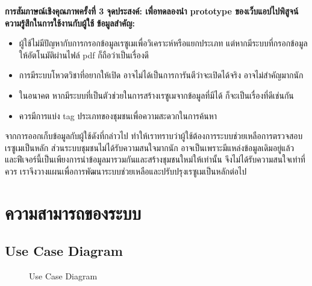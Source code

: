 \noindent\textbf{การสัมภาษณ์เชิงคุณภาพครั้งที่ 3}
\newline
\textbf{จุดประสงค์: เพื่อทดลองนำ prototype ของเว็บแอปไปพิสูจน์ความรู้สึกในการใช้งานกับผู้ใช้}
\newline
\textbf{ข้อมูลสำคัญ:}
\begin{itemize}
    \item ผู้ใช้ไม่มีปัญหากับการกรอกข้อมูลเรซูเมเพื่อวิเคราะห์หรือแยกประเภท แต่หากมีระบบที่กรอกข้อมูลให้อัตโนมัติผ่านไฟล์ pdf ก็ถือว่าเป็นเรื่องดี
    \item การมีระบบโหวตวิชาที่อยากให้เปิด อาจไม่ได้เป็นการการันตีว่าจะเปิดได้จริง อาจไม่สำคัญมากนัก
    \item ในอนาคต หากมีระบบที่เป็นตัวช่วยในการสร้างเรซูเมจากข้อมูลที่มีได้ ก็จะเป็นเรื่องที่ดีเช่นกัน
    \item ควรมีการแบ่ง tag ประเภทของชุมชนเพื่อความสะดวกในการค้นหา
\end{itemize}

จากการออกเก็บข้อมูลกับผู้ใช้ดังที่กล่าวไป ทำให้เราทราบว่าผู้ใช้ต้องการระบบช่วยเหลือการตรวจสอบเรซูเมเป็นหลัก ส่วนระบบชุมชนไม่ได้รับความสนใจมากนัก 
อาจเป็นเพราะมีแหล่งข้อมูลเดิมอยู่แล้ว และฟีเจอร์นี้เป็นเพียงการนำข้อมูลมารวมกันและสร้างชุมชนใหม่ให้เท่านั้น จึงไม่ได้รับความสนใจเท่าที่ควร 
เราจึงวางแผนเพื่อการพัฒนาระบบช่วยเหลือและปรับปรุงเรซูเมเป็นหลักต่อไป


\section{ความสามารถของระบบ}
\subsection{Use Case Diagram}
\begin{figure}[H]\centering
    \setlength{\fboxrule}{0.2mm} %
    \setlength{\fboxsep}{0.5cm}
    \caption{Use Case Diagram}\label{fig:usecase}
\end{figure}
